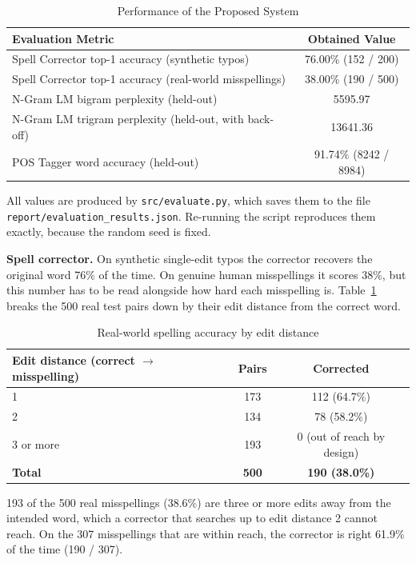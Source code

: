 \documentclass[12pt,a4paper]{report}
\begin{document}
\begin{table}[H]
\centering
\caption{Performance of the Proposed System}
\begin{tabular}{|l|c|}
\hline
\textbf{Evaluation Metric} & \textbf{Obtained Value} \\
\hline
Spell Corrector top-1 accuracy (synthetic typos) & 76.00\% (152 / 200) \\
\hline
Spell Corrector top-1 accuracy (real-world misspellings) & 38.00\% (190 / 500) \\
\hline
N-Gram LM bigram perplexity (held-out) & 5595.97 \\
\hline
N-Gram LM trigram perplexity (held-out, with back-off) & 13641.36 \\
\hline
POS Tagger word accuracy (held-out) & 91.74\% (8242 / 8984) \\
\hline
\end{tabular}
\end{table}

All values are produced by \texttt{src/evaluate.py}, which saves them
to the file \texttt{report/evaluation\_results.json}. Re-running the
script reproduces them exactly, because the random seed is fixed.

\textbf{Spell corrector.} On synthetic single-edit typos the corrector
recovers the original word 76\% of the time. On genuine human
misspellings it scores 38\%, but this number has to be read alongside
how hard each misspelling is. Table~\ref{tab:realworld} breaks the 500
real test pairs down by their edit distance from the correct word.

\begin{table}[H]
\centering
\caption{Real-world spelling accuracy by edit distance}
\label{tab:realworld}
\begin{tabular}{|l|c|c|}
\hline
\textbf{Edit distance (correct $\rightarrow$ misspelling)} & \textbf{Pairs} & \textbf{Corrected} \\
\hline
1 & 173 & 112 (64.7\%) \\
\hline
2 & 134 & 78 (58.2\%) \\
\hline
3 or more & 193 & 0 (out of reach by design) \\
\hline
\textbf{Total} & \textbf{500} & \textbf{190 (38.0\%)} \\
\hline
\end{tabular}
\end{table}

193 of the 500 real misspellings (38.6\%) are three or more edits away
from the intended word, which a corrector that searches up to edit
distance 2 cannot reach. On the 307 misspellings that are within reach,
the corrector is right 61.9\% of the time (190 / 307).
\end{document}
